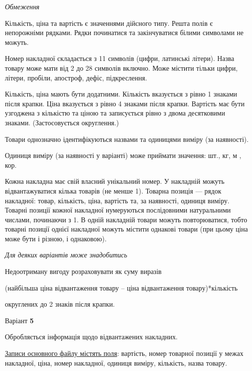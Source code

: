 \documentclass[11pt, ukrainian]{article}
\begin{document}

\bigskip\textit{Обмеження}

Кількість, ціна та вартість є значеннями дійсного типу.
Решта полів є непорожніми рядками.
Рядки починатися та закінчуватися білими символами не можуть.

Номер накладної складається з 11 символів (цифри, латинські літери).
Назва товару може мати від 2 до 28 символів включно.
Може містити тільки цифри, літери, пробіли, апостроф, дефіс, підкреслення.

Кількість, ціна мають бути додатними.
Кількість вказується з рівно 1 знаками після крапки.
Ціна вказується з рівно 4 знаками після крапки.
Вартість має бути узгоджена з кількістю та ціною та записується рівно з двома десятковими знаками.
(Застосовується округлення.)

Товари однозначно ідентифікуються назвами та одиницями виміру (за наявності).

Одиниця виміру (за наявності у варіанті) може приймати значення: шт., кг, м , кор.

Кожна накладна має свій власний унікальний номер.
У накладній можуть відвантажуватися кілька товарів (не менше 1).
Товарна позиція --- рядок накладної: товар, кількість, ціна, вартість та, за наявності, одиниця виміру.
Товарні позиції кожної накладної нумеруються послідовними натуральними числами, починаючи з 1.
В одній накладній товари можуть повторюватися, 
тобто товарні позиції однієї накладної можуть містити однакові товари 
(при цьому ціна може бути і різною, і однаковою).

\bigskip\textit{Для деяких варіантів може знадобитись}

Недоотриману вигоду розраховувати як суму виразів
{\center (найбільша ціна відвантаження товару – ціна відвантаження товару)*кількість\par}

\bigskip
{\noindent} округлених до 2 знаків після крапки.


\par
\newpage
{\center Варіант  \No \textbf { 5 }\par}
\bigskip
Обробляється інформація щодо відвантажених накладних.

\underline{Записи основного файлу містять поля}: вартість, номер товарної позиції у межах накладної, ціна, номер накладної, одиниця виміру, кількість, назва товару.
\end{document}
